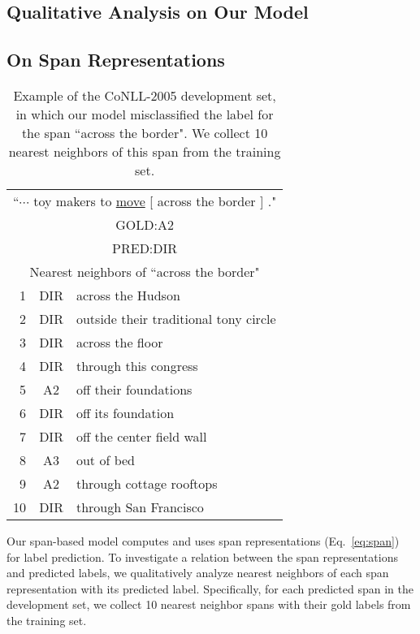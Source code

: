 \documentclass[11pt,a4paper]{article}
\begin{document}
\subsection{Qualitative Analysis on Our Model}
\label{sec:qa}

\subsection*{On Span Representations}
\begin{table}[t]
  \centering
  {\small
  \begin{tabular}{rcl} \toprule
  \multicolumn{3}{c}{``$\cdots$ toy makers to \underline{move} [ across the border ] ."} \\
  \multicolumn{3}{c}{\hspace{2.9cm}GOLD:A2} \\
  \multicolumn{3}{c}{\hspace{2.9cm}PRED:DIR} \\ \hline \hline
  \multicolumn{3}{c}{Nearest neighbors of ``across the border"}\\ \hline
1 & DIR & across the Hudson \\
2 & DIR & outside their traditional tony circle \\
3 & DIR & across the floor \\
4 & DIR & through this congress \\
5 & A2 & off their foundations \\
6 & DIR & off its foundation\\
7 & DIR & off the center field wall \\
8 & A3 & out of bed \\
9 & A2 & through cottage rooftops \\
10 & DIR & through San Francisco \\ \toprule
  \end{tabular}
  }
  \caption{\label{tab:knn} Example of the CoNLL-2005 development set, in which our model misclassified the label for the span ``across the border". We collect 10 nearest neighbors of this span from the training set.}
\end{table}

\noindent
Our span-based model computes and uses span representations (Eq.~\ref{eq:span}) for label prediction.
To investigate a relation between the span representations and predicted labels, we qualitatively analyze nearest neighbors of each span representation with its predicted label.
Specifically, for each predicted span in the development set, we collect 10 nearest neighbor spans with their gold labels from the training set.
\end{document}
